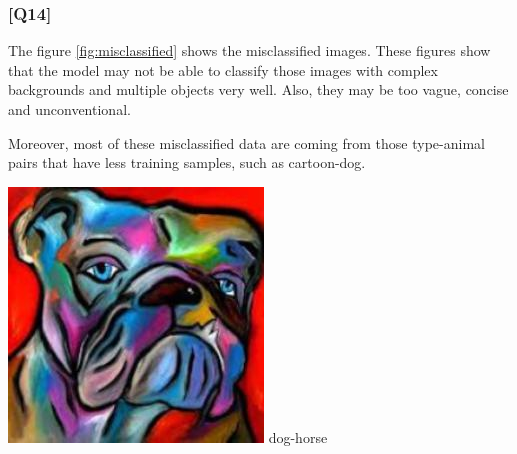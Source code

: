 \documentclass{article}
\begin{document}
\subsubsection*{[Q14]}

The figure \ref{fig:misclassified} shows the misclassified images.
These figures show that the model may not be able to classify those images with complex backgrounds and multiple objects very well.
Also, they may be too vague, concise and unconventional.

Moreover, most of these misclassified data are coming from those type-animal pairs that have less training samples, such as cartoon-dog.

\begin{center}
    \noindent 
    \begin{minipage}{0.142\textwidth}
        \includegraphics[width=\linewidth]{./pic/misclassified_r0_p4_2723.jpg}
        dog-horse
    \end{minipage}%
    \begin{minipage}{0.142\textwidth}

\end{minipage}
\end{center}
\end{document}
